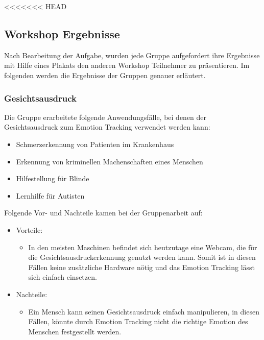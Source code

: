 <<<<<<< HEAD
\subsection{Workshop Ergebnisse}\label{Umsetzung_Anwendungsfaelle_Ergebnisse}
Nach Bearbeitung der Aufgabe, wurden jede Gruppe aufgefordert ihre Ergebnisse mit Hilfe eines Plakats den anderen Workshop Teilnehmer zu präsentieren. Im folgenden werden die Ergebnisse der Gruppen genauer erläutert.

\subsubsection{Gesichtsausdruck}
Die Gruppe erarbeitete folgende Anwendungsfälle, bei denen der Gesichtsausdruck zum Emotion Tracking verwendet werden kann:
\begin{itemize}
	\item Schmerzerkennung von Patienten im Krankenhaus
	\item Erkennung von kriminellen Machenschaften eines Menschen
	\item Hilfestellung für Blinde
	\item Lernhilfe für Autisten
\end{itemize}
Folgende Vor- und Nachteile kamen bei der Gruppenarbeit auf:
\begin{itemize}
	\item Vorteile:
	\begin{itemize}
		\item In den meisten Maschinen befindet sich heutzutage eine Webcam, die für die Gesichtsausdruckerkennung genutzt werden kann. Somit ist in diesen Fällen keine zusätzliche Hardware nötig und das Emotion Tracking lässt sich einfach einsetzen.		 
	\end{itemize}
	\item Nachteile:
	\begin{itemize}
		\item Ein Mensch kann seinen Gesichtsausdruck einfach manipulieren, in diesen Fällen, könnte durch Emotion Tracking nicht die richtige Emotion des Menschen festgestellt werden.
	\end{itemize}
\end{itemize}

